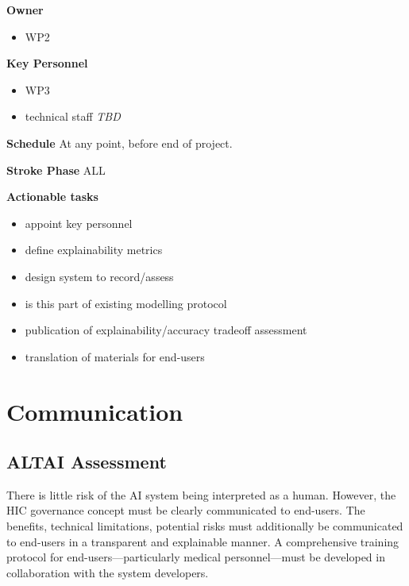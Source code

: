 \documentclass[
  letterpaper,
  DIV=11,
  numbers=noendperiod]{scrreport}
\providecommand{\tightlist}{%
  \setlength{\itemsep}{0pt}\setlength{\parskip}{0pt}}\usepackage{longtable,booktabs,array}
\begin{document}
\textbf{Owner}

\begin{itemize}
\tightlist
\item
  WP2
\end{itemize}

\textbf{Key Personnel}

\begin{itemize}
\tightlist
\item
  WP3
\item
  technical staff \emph{TBD}
\end{itemize}

\textbf{Schedule} At any point, before end of project.

\textbf{Stroke Phase} ALL

\textbf{Actionable tasks}

\begin{itemize}
\tightlist
\item
  appoint key personnel
\item
  define explainability metrics
\item
  design system to record/assess
\item
  is this part of existing modelling protocol
\item
  publication of explainability/accuracy tradeoff assessment
\item
  translation of materials for end-users
\end{itemize}

\hypertarget{communication}{%
\section{Communication}\label{communication}}

\hypertarget{altai-assessment-10}{%
\subsection*{ALTAI Assessment}\label{altai-assessment-10}}

There is little risk of the AI system being interpreted as a human.
However, the HIC governance concept must be clearly communicated to
end-users. The benefits, technical limitations, potential risks must
additionally be communicated to end-users in a transparent and
explainable manner. A comprehensive training protocol for
end-users---particularly medical personnel---must be developed in
collaboration with the system developers.
\end{document}
